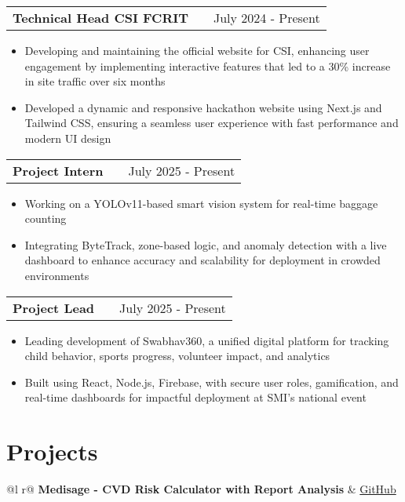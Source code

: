 \documentclass[a4paper,12pt]{article}
\makeatletter
\newenvironment{joblong}[2]
    {
    \begin{tabularx}{\linewidth}{@{}l X r@{}}
    \textbf{#1} & \hfill &  #2 \\[3.75pt]
    \end{tabularx}
    \begin{minipage}[t]{\linewidth}
    \begin{itemize}[nosep,after=\strut, leftmargin=1em, itemsep=3pt,label=--]
    }
    {
    \end{itemize}
    \end{minipage}    
    }
\makeatother
\begin{document}
\begin{joblong}{Technical Head CSI FCRIT}{July 2024 - Present}
\textbf{Fr.C. Rodrigues Institute of Technology, Vashi}
\item Developing and maintaining the official website for CSI, enhancing user engagement by implementing interactive features that led to a 30\% increase in site traffic over six months
\item Developed a dynamic and responsive hackathon website using Next.js and Tailwind CSS, ensuring a seamless user experience with fast performance and modern UI design
\end{joblong}

\begin{joblong}{Project Intern}{July 2025 - Present}
\textbf{IISER x Suraj Informatics}
\item Working on a YOLOv11-based smart vision system for real-time baggage counting
\item Integrating ByteTrack, zone-based logic, and anomaly detection with a live dashboard to enhance accuracy and scalability for deployment in crowded environments
\end{joblong}

\begin{joblong}{Project Lead}{July 2025 - Present}
\textbf{Sport Mentoring Infusion - NGO}
\item Leading development of Swabhav360, a unified digital platform for tracking child behavior, sports progress, volunteer impact, and analytics
\item Built using React, Node.js, Firebase, with secure user roles, gamification, and real-time dashboards for impactful deployment at SMI's national event
\end{joblong}

\section{Projects}

\begin{tabularx}{\linewidth}{ @{}l r@{} }
\textbf{Medisage - CVD Risk Calculator with Report Analysis} & \hfill \href{https://github.com}{GitHub} \\[3.75pt]
  \\
\end{tabularx}
\end{document}
